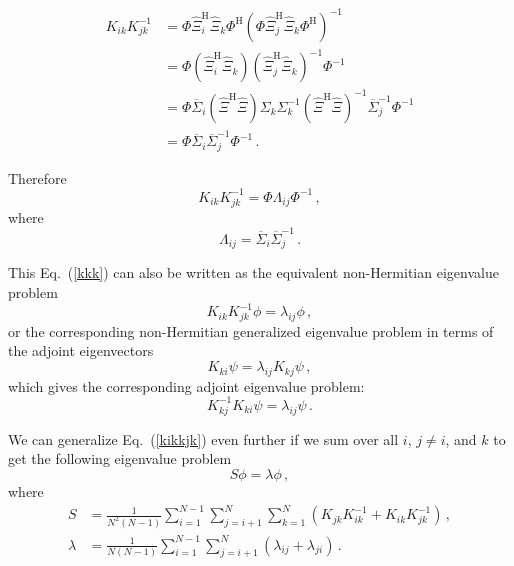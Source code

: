 \documentclass[10pt]{article}
\newcommand{\eq}[1]{Eq.\ (\ref{#1})}
\begin{document}
\begin{equation}
\begin{aligned}
    K_{ik} K_{jk}^{-1} &=  \Phi \hat \Xi_i^\mathrm{H}  \hat \Xi_k \Phi^\mathrm{H}
    \left(\Phi \hat \Xi_j^\mathrm{H}  \hat \Xi_k \Phi^\mathrm{H}\right)^{-1}\\
    &=  \Phi \left(\hat \Xi_i^\mathrm{H}  \hat \Xi_k \right) \left(\hat \Xi_j^\mathrm{H}  \hat \Xi_k \right)^{-1} \Phi^{-1}\\ 
    &=  \Phi \overline \Sigma_i \left(\hat \Xi^\mathrm{H}  \hat \Xi \right) \Sigma_k \Sigma_k^{-1} \left(\hat \Xi^\mathrm{H}  \hat \Xi \right)^{-1} \overline \Sigma_j^{-1} \Phi^{-1}\\
    &=  \Phi \overline \Sigma_i \overline \Sigma_j^{-1} \Phi^{-1}\,.
\end{aligned}
\end{equation}

Therefore
\begin{equation}\label{kkk}
    K_{ik} K_{jk}^{-1} = \Phi \Lambda_{ij} \Phi^{-1}\,,
\end{equation}
where
\begin{equation}\label{Lij}
    \Lambda_{ij} = \overline \Sigma_i \overline \Sigma_j^{-1}\,.
\end{equation}

This \eq{kkk} can also be written as the equivalent non-Hermitian eigenvalue problem
\begin{equation}\label{kikkjk}
    K_{ik} K_{jk}^{-1} \phi = \lambda_{ij} \phi\,,
\end{equation}
or the corresponding non-Hermitian generalized eigenvalue problem in terms of the adjoint eigenvectors
\begin{equation}
    K_{ki}\psi = \lambda_{ij} K_{kj} \psi \,,
\end{equation}
which gives the corresponding adjoint eigenvalue problem:
\begin{equation}
    K_{kj}^{-1} K_{ki}\psi = \lambda_{ij} \psi \,.
\end{equation}

We can generalize \eq{kikkjk} even further if we sum over all $i$, $j\ne i$, and $k$ to get the following eigenvalue problem
\begin{equation}
     S \phi = \lambda \phi\,,
\end{equation}
where
\begin{equation}
\begin{aligned}
    S & = \frac{1}{N^2(N-1)}\sum_{i=1}^{N-1} \sum_{j=i+1}^N\sum_{k=1}^N \left(K_{jk}K_{ik}^{-1}+K_{ik}K_{jk}^{-1}\right)\,,\\
    \lambda & = \frac{1}{N(N-1)}\sum_{i=1}^{N-1} \sum_{j=i+1}^N \left(\lambda_{ij}+\lambda_{ji}\right)\,.
\end{aligned}    
\end{equation}
\end{document}
